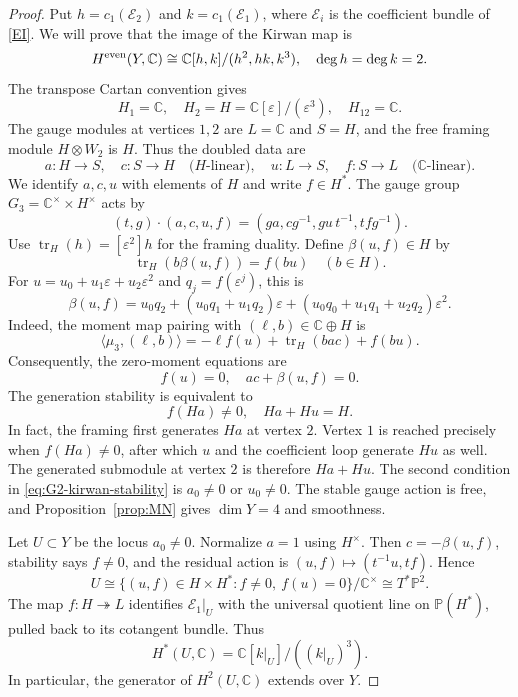 \documentclass[11pt,reqno]{amsart}
\theoremstyle{definition}
\theoremstyle{remark}
\def\bbC{\mathbb C}
\begin{document}
\begin{proof}
Put
$h=c_1(\mathcal E_2)$ and $k=c_1(\mathcal E_1)$, where
$\mathcal E_i$ is the coefficient bundle of \eqref{EI}. 
We will prove that the image of the Kirwan map is
\[
 H^{\rm even}(Y,\bbC)
 \cong\bbC[h,k]/(h^2,hk,k^3),\quad \deg h=\deg k=2.
\]
The transpose Cartan convention gives
\[
 H_1=\bbC,\quad H_2=H=\bbC[\varepsilon]/(\varepsilon^3),
 \quad H_{12}=\bbC.
\]
The gauge modules at vertices $1,2$ are $L=\bbC$ and $S=H$,
and the free framing module $H\otimes W_2$ is $H$.
Thus the doubled data are
\[
 a:H\to S,\quad c:S\to H\quad\text{($H$-linear)},\quad
 u:L\to S,\quad f:S\to L\quad\text{($\bbC$-linear)}.
\]
We identify $a,c,u$ with elements of $H$ and write $f\in H^*$.
The gauge group $G_3=\bbC^\times\times H^\times$ acts by
\[
 (t,g)\cdot(a,c,u,f)=(ga,cg^{-1},gu\,t^{-1},tfg^{-1}).
\]
Use $\operatorname{tr}_H(h)=[\varepsilon^2]h$ for the framing
duality. Define $\beta(u,f)\in H$ by
\[
 \operatorname{tr}_H(b\beta(u,f))=f(bu)\quad(b\in H).
\]
For $u=u_0+u_1\varepsilon+u_2\varepsilon^2$ and
$q_j=f(\varepsilon^j)$, this is
\[
 \beta(u,f)=u_0q_2+(u_0q_1+u_1q_2)\varepsilon
       +(u_0q_0+u_1q_1+u_2q_2)\varepsilon^2.
\]
Indeed, the moment map pairing with $(\ell,b)\in\bbC\oplus H$ is
\[
 \langle\mu_3,(\ell,b)\rangle
   =-\ell f(u)+\operatorname{tr}_H(bac)+f(bu).
\]
Consequently, the zero-moment equations are
\begin{equation}\label{eq:G2-kirwan-moment}
 f(u)=0,\quad ac+\beta(u,f)=0.
\end{equation}
The generation stability is equivalent to
\begin{equation}\label{eq:G2-kirwan-stability}
 f(Ha)\ne0,\quad Ha+Hu=H.
\end{equation}
In fact, the framing first generates $Ha$ at vertex $2$.
Vertex $1$ is reached precisely when $f(Ha)\ne0$, after which
$u$ and the coefficient loop generate $Hu$ as well. The generated
submodule at vertex $2$ is therefore  $Ha+Hu$.
The second condition in \eqref{eq:G2-kirwan-stability} is
$a_0\ne0$ or $u_0\ne0$. The stable gauge action is free, and
Proposition~\ref{prop:MN} gives
$\dim Y=4$ and smoothness.


Let $U\subset Y$ be the locus $a_0\ne0$. Normalize $a=1$
using $H^\times$. Then $c=-\beta(u,f)$, stability says $f\ne0$,
and the residual action is $(u,f)\mapsto(t^{-1}u,tf)$.
Hence
\begin{equation}\label{eq:G2-kirwan-open}
 U\cong\{(u,f)\in H\times H^*:f\ne0,\ f(u)=0\}/\bbC^\times
   \cong T^*\mathbb P^2.
\end{equation}
The map $f:H\twoheadrightarrow L$ identifies
$\mathcal E_1|_U$ with the universal quotient line on
$\mathbb P(H^*)$, pulled back to its cotangent bundle. Thus
\begin{equation}\label{eq:G2-kirwan-open-cohomology}
 H^*(U,\bbC)=\bbC[k|_U]/((k|_U)^3).
\end{equation}
In particular, the generator of $H^2(U,\bbC)$ extends over $Y$.



\end{proof}
\end{document}
